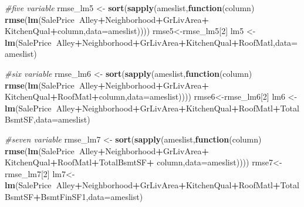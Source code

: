 \documentclass[]{article}
\newenvironment{Shaded}{\begin{snugshade}}{\end{snugshade}}
\newcommand{\CommentTok}[1]{\textcolor[rgb]{0.56,0.35,0.01}{\textit{#1}}}
\newcommand{\ControlFlowTok}[1]{\textcolor[rgb]{0.13,0.29,0.53}{\textbf{#1}}}
\newcommand{\DataTypeTok}[1]{\textcolor[rgb]{0.13,0.29,0.53}{#1}}
\newcommand{\DecValTok}[1]{\textcolor[rgb]{0.00,0.00,0.81}{#1}}
\newcommand{\KeywordTok}[1]{\textcolor[rgb]{0.13,0.29,0.53}{\textbf{#1}}}
\newcommand{\NormalTok}[1]{#1}
\newcommand{\OperatorTok}[1]{\textcolor[rgb]{0.81,0.36,0.00}{\textbf{#1}}}
\newcommand{\StringTok}[1]{\textcolor[rgb]{0.31,0.60,0.02}{#1}}
\begin{document}
\begin{Shaded}
\begin{Highlighting}[]
\CommentTok{#five variable}
\NormalTok{rmse_lm5 <-}\StringTok{ }\KeywordTok{sort}\NormalTok{(}\KeywordTok{sapply}\NormalTok{(ameslist,}\ControlFlowTok{function}\NormalTok{(column) }\KeywordTok{rmse}\NormalTok{(}\KeywordTok{lm}\NormalTok{(SalePrice}\OperatorTok{~}\NormalTok{Alley}\OperatorTok{+}\NormalTok{Neighborhood}\OperatorTok{+}\NormalTok{GrLivArea}\OperatorTok{+}
\StringTok{                                                            }\NormalTok{KitchenQual}\OperatorTok{+}\NormalTok{column,}\DataTypeTok{data=}\NormalTok{ameslist))))}
\NormalTok{rmse5<-rmse_lm5[}\DecValTok{2}\NormalTok{]}
\NormalTok{lm5 <-}\StringTok{ }\KeywordTok{lm}\NormalTok{(SalePrice}\OperatorTok{~}\NormalTok{Alley}\OperatorTok{+}\NormalTok{Neighborhood}\OperatorTok{+}\NormalTok{GrLivArea}\OperatorTok{+}\NormalTok{KitchenQual}\OperatorTok{+}\NormalTok{RoofMatl,}\DataTypeTok{data=}\NormalTok{ameslist)}

\CommentTok{#six variable}
\NormalTok{rmse_lm6 <-}\StringTok{ }\KeywordTok{sort}\NormalTok{(}\KeywordTok{sapply}\NormalTok{(ameslist,}\ControlFlowTok{function}\NormalTok{(column) }\KeywordTok{rmse}\NormalTok{(}\KeywordTok{lm}\NormalTok{(SalePrice}\OperatorTok{~}\NormalTok{Alley}\OperatorTok{+}\NormalTok{Neighborhood}\OperatorTok{+}\NormalTok{GrLivArea}\OperatorTok{+}
\StringTok{                                                            }\NormalTok{KitchenQual}\OperatorTok{+}\NormalTok{RoofMatl}\OperatorTok{+}\NormalTok{column,}\DataTypeTok{data=}\NormalTok{ameslist))))}
\NormalTok{rmse6<-rmse_lm6[}\DecValTok{2}\NormalTok{]}
\NormalTok{lm6 <-}\KeywordTok{lm}\NormalTok{(SalePrice}\OperatorTok{~}\NormalTok{Alley}\OperatorTok{+}\NormalTok{Neighborhood}\OperatorTok{+}\NormalTok{GrLivArea}\OperatorTok{+}\NormalTok{KitchenQual}\OperatorTok{+}\NormalTok{RoofMatl}\OperatorTok{+}\NormalTok{TotalBsmtSF,}\DataTypeTok{data=}\NormalTok{ameslist)}

\CommentTok{#seven variable}
\NormalTok{rmse_lm7 <-}\StringTok{ }\KeywordTok{sort}\NormalTok{(}\KeywordTok{sapply}\NormalTok{(ameslist,}\ControlFlowTok{function}\NormalTok{(column) }\KeywordTok{rmse}\NormalTok{(}\KeywordTok{lm}\NormalTok{(SalePrice}\OperatorTok{~}\NormalTok{Alley}\OperatorTok{+}\NormalTok{Neighborhood}\OperatorTok{+}\NormalTok{GrLivArea}\OperatorTok{+}
\StringTok{                                                            }\NormalTok{KitchenQual}\OperatorTok{+}\NormalTok{RoofMatl}\OperatorTok{+}\NormalTok{TotalBsmtSF}\OperatorTok{+}
\StringTok{                                                            }\NormalTok{column,}\DataTypeTok{data=}\NormalTok{ameslist))))}
\NormalTok{rmse7<-rmse_lm7[}\DecValTok{2}\NormalTok{]}
\NormalTok{lm7<-}\KeywordTok{lm}\NormalTok{(SalePrice}\OperatorTok{~}\NormalTok{Alley}\OperatorTok{+}\NormalTok{Neighborhood}\OperatorTok{+}\NormalTok{GrLivArea}\OperatorTok{+}\NormalTok{KitchenQual}\OperatorTok{+}\NormalTok{RoofMatl}\OperatorTok{+}\NormalTok{TotalBsmtSF}\OperatorTok{+}\NormalTok{BsmtFinSF1,}\DataTypeTok{data=}\NormalTok{ameslist)}


\end{Highlighting}
\end{Shaded}
\end{document}

